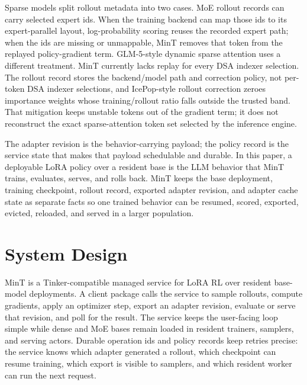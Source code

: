 \documentclass{llmxive}
\begin{document}
Sparse models split rollout metadata into two cases. MoE rollout records can carry selected expert ids. When the training backend can map those ids to its expert-parallel layout, log-probability scoring reuses the recorded expert path; when the ids are missing or unmappable, MinT removes that token from the replayed policy-gradient term. GLM-5-style dynamic sparse attention uses a different treatment. MinT currently lacks replay for every DSA indexer selection. The rollout record stores the backend/model path and correction policy, not per-token DSA indexer selections, and IcePop-style rollout correction zeroes importance weights whose training/rollout ratio falls outside the trusted band. That mitigation keeps unstable tokens out of the gradient term; it does not reconstruct the exact sparse-attention token set selected by the inference engine.

The adapter revision is the behavior-carrying payload; the policy record is the service state that makes that payload schedulable and durable. In this paper, a deployable LoRA policy over a resident base is the LLM behavior that MinT trains, evaluates, serves, and rolls back. MinT keeps the base deployment, training checkpoint, rollout record, exported adapter revision, and adapter cache state as separate facts so one trained behavior can be resumed, scored, exported, evicted, reloaded, and served in a larger population.

\section{System Design}
\label{sec:architecture}

MinT is a Tinker-compatible managed service for LoRA RL over resident base-model deployments. A client package calls the service to sample rollouts, compute gradients, apply an optimizer step, export an adapter revision, evaluate or serve that revision, and poll for the result. The service keeps the user-facing loop simple while dense and MoE bases remain loaded in resident trainers, samplers, and serving actors. Durable operation ids and policy records keep retries precise: the service knows which adapter generated a rollout, which checkpoint can resume training, which export is visible to samplers, and which resident worker can run the next request.
\end{document}
